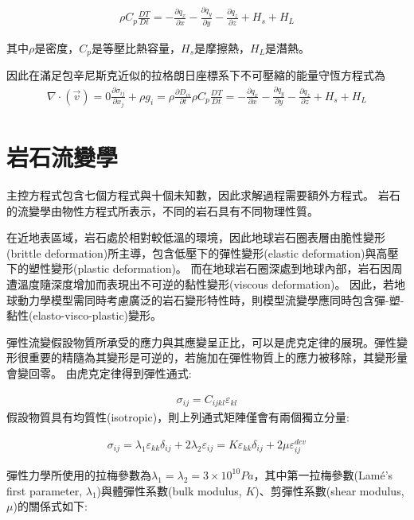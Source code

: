 \begin{align}
\rho C_p \frac{DT}{Dt} = -\frac{\partial q_x}{\partial x}-\frac{\partial q_y}{\partial y}-\frac{\partial q_z}{\partial z}+H_s+H_L
\end{align}

其中$\rho$是密度，$C_p$是等壓比熱容量，$H_s$是摩擦熱，$H_L$是潛熱。

因此在滿足包辛尼斯克近似的拉格朗日座標系下不可壓縮的能量守恆方程式為
\begin{align}
\nabla \cdot (\vec v) = 0 
\frac{\partial \sigma_{ij}}{\partial x_j}+\rho g_i = \rho \frac{\partial D_{vi}}{\partial t}
\rho C_p \frac{DT}{Dt} = -\frac{\partial q_x}{\partial x}-\frac{\partial q_y}{\partial y}-\frac{\partial q_z}{\partial z}+H_s+H_L
\end{align}

\section{岩石流變學}
主控方程式包含七個方程式與十個未知數，因此求解過程需要額外方程式。
岩石的流變學由物性方程式所表示，不同的岩石具有不同物理性質。

在近地表區域，岩石處於相對較低溫的環境，因此地球岩石圈表層由脆性變形(brittle deformation)所主導，包含低壓下的彈性變形(elastic deformation)與高壓下的塑性變形(plastic deformation)。
而在地球岩石圈深處到地球內部，岩石因周遭溫度隨深度增加而表現出不可逆的黏性變形(viscous deformation)。
因此，若地球動力學模型需同時考慮廣泛的岩石變形特性時，則模型流變學應同時包含彈-塑-黏性(elasto-visco-plastic)變形。

彈性流變假設物質所承受的應力與其應變呈正比，可以是虎克定律的展現。彈性變形很重要的精隨為其變形是可逆的，若施加在彈性物質上的應力被移除，其變形量會變回零。
由虎克定律得到彈性通式:

\begin{align}
\sigma_{ij}=C_{ijkl} 𝜀_{kl}
\end{align}
假設物質具有均質性(isotropic)，則上列通式矩陣僅會有兩個獨立分量:

\begin{align}
    \sigma_{ij}=\lambda_1 ε_{kk} δ_{ij}+2 λ_2 ε_{ij}=Kε_{kk} δ_{ij}+2 \mu ε_{ij}^{dev} \label{eqn:elastic tensor}
\end{align}

彈性力學所使用的拉梅參數為$\lambda_1 = \lambda_2 = 3 \times 10^{10} Pa$，其中第一拉梅參數(Lamé's first parameter, $\lambda_1$)與體彈性系數(bulk modulus, $K$)、剪彈性系數(shear modulus, $\mu$)的關係式如下:

